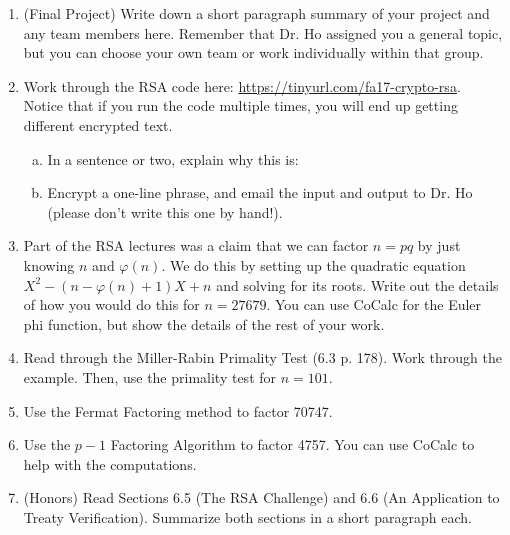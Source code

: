 \documentclass[12pt]{amsart}
\theoremstyle{plain}
\theoremstyle{definition}
\begin{document}
\begin{enumerate}[1.]
	\item (Final Project) Write down a short paragraph summary of your project and any team members here.  Remember that Dr. Ho assigned you a general topic, but you can choose your own team or work individually within that group.
    \begin{framed}
    \vspace{2.5in}
    \end{framed}
    \item Work through the RSA code here: \url{https://tinyurl.com/fa17-crypto-rsa}.  Notice that if you run the code multiple times, you will end up getting different encrypted text.
    \begin{enumerate}[a.]
    \item In a sentence or two, explain why this is:
   \begin{framed}
	\vspace{.5in}
	\end{framed}
    \item Encrypt a one-line phrase, and email the input and output to Dr. Ho (please don't write this one by hand!).
	\end{enumerate}
    \item Part of the RSA lectures was a claim that we can factor $n = pq$ by just knowing $n$ and $\varphi(n)$.  We do this by setting up the quadratic equation $X^2 - (n - \varphi(n) + 1)X + n$ and solving for its roots.  Write out the details of how you would do this for $n = 27679$.  You can use CoCalc for the Euler phi function, but show the details of the rest of your work.
		\begin{framed}
		\vspace{2in}
		\end{framed}
   \item Read through the Miller-Rabin Primality Test (6.3 p. 178).  Work through the example.  Then, use the primality test for $n = 101$.
		\begin{framed}
		\vspace{2in}
		\end{framed}
	\item Use the Fermat Factoring method to factor 70747.
		\begin{framed}
		\vspace{2in}
		\end{framed}
	\item Use the $p-1$ Factoring Algorithm to factor 4757. You can use CoCalc to help with the computations.
		\begin{framed}
		\vspace{3in}
		\end{framed}
	\item (Honors) Read Sections 6.5 (The RSA Challenge) and 6.6 (An Application to Treaty Verification).  Summarize both sections in a short paragraph each.
    	\begin{framed}
		\vspace{3in}
		\end{framed}
\end{enumerate}
\end{document}
